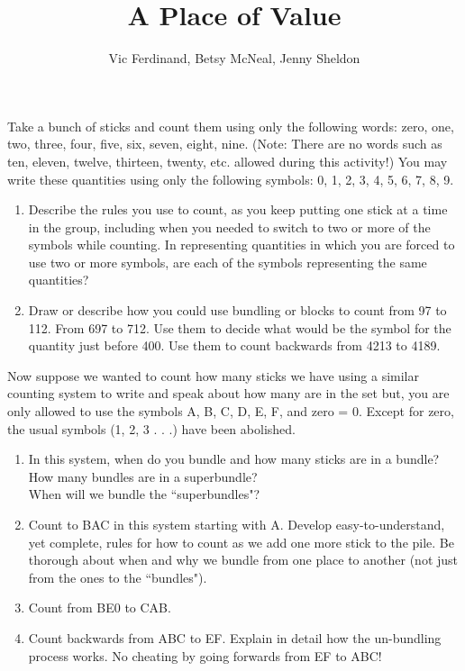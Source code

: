 \documentclass[nooutcomes]{ximera}
\title{A Place of Value}
\author{Vic Ferdinand, Betsy McNeal, Jenny Sheldon}
\begin{document}
\begin{abstract}\end{abstract}
\maketitle



\begin{problem}\label{PlaceOfValue1}
 Take a bunch of sticks and count them using only the following words: zero, one, two, three, four, five, six, seven, eight, nine. (Note:  There are no words such as ten, eleven, twelve, thirteen, twenty, etc. allowed during this activity!)  You may write these quantities using only the following symbols:  0, 1, 2, 3, 4, 5, 6, 7, 8, 9.
\begin{enumerate}
\item Describe the rules you use to count, as you keep putting one stick at a time in the group, including when you needed to switch to two or more of the symbols while counting.  In representing quantities in which you are forced to use two or more symbols, are each of the symbols representing the same quantities?  
\item Draw or describe how you could use bundling or blocks to count from 97 to 112.  From 697 to 712.  Use them to decide what would be the symbol for the quantity just before 400.  Use them to count backwards from 4213 to 4189.
\end{enumerate}
\end{problem}

\begin{problem} \label{PlaceOfValue2}
 Now suppose we wanted to count how many sticks we have using a similar counting system to write and speak about how many are in the set but, you are only allowed to use the symbols A, B, C, D, E, F, and zero = 0. Except for zero, the usual symbols (1, 2, 3 . . .) have been abolished.
\begin{enumerate}
\item In this system, when do you bundle and how many sticks are in a bundle?\\ How many bundles are in a superbundle?  \\
When will we bundle the ``superbundles"?  
\item Count to BAC in this system starting with A.   Develop easy-to-understand, yet complete, rules for how to count as we add one more stick to the pile.  Be thorough about when and why we bundle from one place to another (not just from the ones to the ``bundles").
\item Count from BE0 to CAB.  
\item Count backwards from ABC to EF. Explain in detail how the un-bundling process works. No cheating by going forwards from EF to ABC!  
\end{enumerate}
\end{problem}
\end{document}
